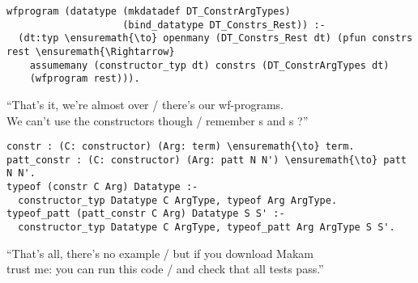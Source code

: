 \begin{verbatim}
wfprogram (datatype (mkdatadef DT_ConstrArgTypes)
                    (bind_datatype DT_Constrs_Rest)) :-
  (dt:typ \ensuremath{\to} openmany (DT_Constrs_Rest dt) (pfun constrs rest \ensuremath{\Rightarrow}
    assumemany (constructor_typ dt) constrs (DT_ConstrArgTypes dt)
    (wfprogram rest))).
\end{verbatim}

\begin{versy}
``That's it, we're almost over / there's our wf-programs. \\
We can't use the constructors though / remember s and s ?''
\end{versy}

\begin{verbatim}
constr : (C: constructor) (Arg: term) \ensuremath{\to} term.
patt_constr : (C: constructor) (Arg: patt N N') \ensuremath{\to} patt N N'.
typeof (constr C Arg) Datatype :-
  constructor_typ Datatype C ArgType, typeof Arg ArgType.
typeof_patt (patt_constr C Arg) Datatype S S' :-
  constructor_typ Datatype C ArgType, typeof_patt Arg ArgType S S'.
\end{verbatim}

\begin{versy}
``That's all, there's no example / but if you download Makam \\
trust me: you can run this code / and check that all tests pass.''
\end{versy}
